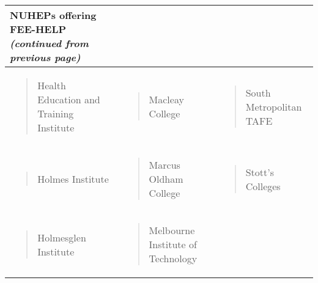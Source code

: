 \documentclass[]{book}
\begin{document}
\begin{longtable}[]{@{}lll@{}}
\toprule
\textbf{NUHEPs offering FEE-HELP} \emph{(continued from previous page)}\tabularnewline
\midrule
\endhead
\begin{minipage}[t]{0.32\columnwidth}\raggedright
\begin{quote}
Health Education and Training Institute
\end{quote}\strut
\end{minipage} & \begin{minipage}[t]{0.32\columnwidth}\raggedright
\begin{quote}
Macleay College
\end{quote}\strut
\end{minipage} & \begin{minipage}[t]{0.32\columnwidth}\raggedright
\begin{quote}
South Metropolitan TAFE
\end{quote}\strut
\end{minipage}\tabularnewline
\begin{minipage}[t]{0.32\columnwidth}\raggedright
\begin{quote}
Holmes Institute
\end{quote}\strut
\end{minipage} & \begin{minipage}[t]{0.32\columnwidth}\raggedright
\begin{quote}
Marcus Oldham College
\end{quote}\strut
\end{minipage} & \begin{minipage}[t]{0.32\columnwidth}\raggedright
\begin{quote}
Stott's Colleges
\end{quote}\strut
\end{minipage}\tabularnewline
\begin{minipage}[t]{0.32\columnwidth}\raggedright
\begin{quote}
Holmesglen Institute
\end{quote}\strut
\end{minipage} & \begin{minipage}[t]{0.32\columnwidth}\raggedright
\begin{quote}
Melbourne Institute of Technology
\end{quote}\strut
\end{minipage} & \begin{minipage}[t]{0.32\columnwidth}\raggedright
\begin{quote}

\end{quote}
\end{minipage}
\end{longtable}
\end{document}
